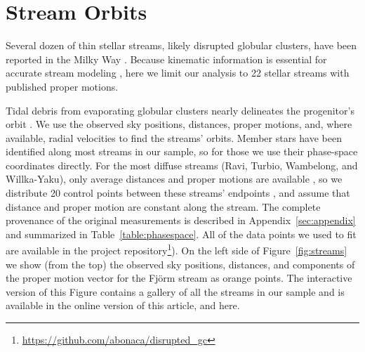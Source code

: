 \documentclass[twocolumn]{aastex63}
\newcommand{\package}[1]{\textsl{#1}}
\begin{document}
\section{Stream Orbits}
\label{sec:orbits}

Several dozen of thin stellar streams, likely disrupted globular clusters, have been reported in the Milky Way \citep[an up-to-date list is available in the \package{galstreams} package,][]{mateu:2018}.
Because kinematic information is essential for accurate stream modeling \citep{bh:2018}, here we limit our analysis to 22 stellar streams with published proper motions.

Tidal debris from evaporating globular clusters nearly delineates the progenitor's orbit \citep[e.g.,][]{kupper:2012}.
We use the observed sky positions, distances, proper motions, and, where available, radial velocities to find the streams' orbits.
Member stars have been identified along most streams in our sample, so for those we use their phase-space coordinates directly.
For the most diffuse streams (Ravi, Turbio, Wambelong, and Willka-Yaku), only average distances and proper motions are available \citep{shipp:2019}, so we distribute 20 control points between these streams' endpoints \citep{riley:2020}, and assume that distance and proper motion are constant along the stream.
The complete provenance of the original measurements is described in Appendix~\ref{sec:appendix} and summarized in Table~\ref{table:phasespace}.
All of the data points we used to fit are available in the project repository\footnote{\url{https://github.com/abonaca/disrupted_gc}}).
On the left side of Figure~\ref{fig:streams} we show (from the top) the observed sky positions, distances, and components of the proper motion vector for the Fj\" orm stream as orange points.
The interactive version of this Figure contains a gallery of all the streams in our sample and is available in the online version of this article, and here.

\end{document}
